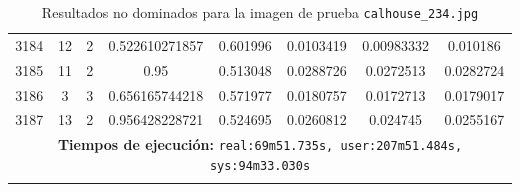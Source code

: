 \begin{longtable}{|c|c|c|c|c|c|c|c|}
3184 & 12 & 2 & 0.522610271857 & 0.601996 & 0.0103419 & 0.00983332 & 0.010186 \\
3185 & 11 & 2 & 0.95 & 0.513048 & 0.0288726 & 0.0272513 & 0.0282724 \\
3186 & 3 & 3 & 0.656165744218 & 0.571977 & 0.0180757 & 0.0172713 & 0.0179017 \\
3187 & 13 & 2 & 0.956428228721 & 0.524695 & 0.0260812 & 0.024745 & 0.0255167 \\
\hline
\multicolumn{8}{|c|}{\textbf{Tiempos de ejecución:} \texttt{real:69m51.735s, user:207m51.484s, sys:94m33.030s}}\\  \hline
\caption{Resultados no dominados para la imagen de prueba \texttt{calhouse\_234.jpg}}
\label{tab:calhouse_234}
\end{longtable}
\normalsize

